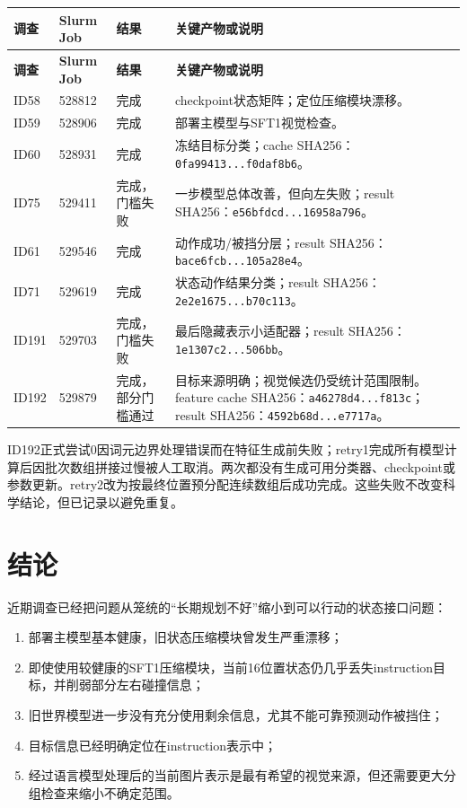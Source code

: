 \documentclass[UTF8,11pt,a4paper,fontset=none]{ctexart}
\newcommand{\code}[1]{\texttt{#1}}
\begin{document}
\begin{longtable}{p{1.3cm}p{2.2cm}p{2.3cm}p{8.3cm}}
\toprule
\textbf{调查} & \textbf{Slurm Job} & \textbf{结果} & \textbf{关键产物或说明} \\
\midrule
\endfirsthead
\toprule
\textbf{调查} & \textbf{Slurm Job} & \textbf{结果} & \textbf{关键产物或说明} \\
\midrule
\endhead
ID58 & 528812 & 完成 & checkpoint状态矩阵；定位压缩模块漂移。 \\
ID59 & 528906 & 完成 & 部署主模型与SFT1视觉检查。 \\
ID60 & 528931 & 完成 & 冻结目标分类；cache SHA256：\code{0fa99413...f0daf8b6}。 \\
ID75 & 529411 & 完成，门槛失败 & 一步模型总体改善，但向左失败；result SHA256：\code{e56bfdcd...16958a796}。 \\
ID61 & 529546 & 完成 & 动作成功/被挡分层；result SHA256：\code{bace6fcb...105a28e4}。 \\
ID71 & 529619 & 完成 & 状态动作结果分类；result SHA256：\code{2e2e1675...b70c113}。 \\
ID191 & 529703 & 完成，门槛失败 & 最后隐藏表示小适配器；result SHA256：\code{1e1307c2...506bb}。 \\
ID192 & 529879 & 完成，部分门槛通过 & 目标来源明确；视觉候选仍受统计范围限制。feature cache SHA256：\code{a46278d4...f813c}；result SHA256：\code{4592b68d...e7717a}。 \\
\bottomrule
\end{longtable}

ID192正式尝试0因词元边界处理错误而在特征生成前失败；retry1完成所有模型计算后因批次数组拼接过慢被人工取消。两次都没有生成可用分类器、checkpoint或参数更新。retry2改为按最终位置预分配连续数组后成功完成。这些失败不改变科学结论，但已记录以避免重复。

\section{结论}

近期调查已经把问题从笼统的“长期规划不好”缩小到可以行动的状态接口问题：

\begin{enumerate}
  \item 部署主模型基本健康，旧状态压缩模块曾发生严重漂移；
  \item 即使使用较健康的SFT1压缩模块，当前16位置状态仍几乎丢失instruction目标，并削弱部分左右碰撞信息；
  \item 旧世界模型进一步没有充分使用剩余信息，尤其不能可靠预测动作被挡住；
  \item 目标信息已经明确定位在instruction表示中；
  \item 经过语言模型处理后的当前图片表示是最有希望的视觉来源，但还需要更大分组检查来缩小不确定范围。
\end{enumerate}
\end{document}

